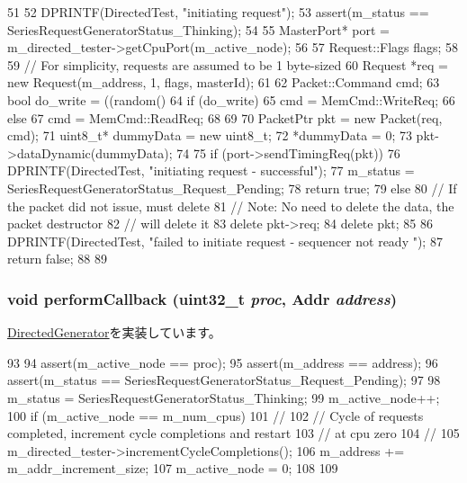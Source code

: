 \begin{DoxyCode}
51 {
52     DPRINTF(DirectedTest, "initiating request\n");
53     assert(m_status == SeriesRequestGeneratorStatus_Thinking);
54 
55     MasterPort* port = m_directed_tester->getCpuPort(m_active_node);
56 
57     Request::Flags flags;
58 
59     // For simplicity, requests are assumed to be 1 byte-sized
60     Request *req = new Request(m_address, 1, flags, masterId);
61 
62     Packet::Command cmd;
63     bool do_write = ((random() %
64     if (do_write) {
65         cmd = MemCmd::WriteReq;
66     } else {
67         cmd = MemCmd::ReadReq;
68     }
69 
70     PacketPtr pkt = new Packet(req, cmd);
71     uint8_t* dummyData = new uint8_t;
72     *dummyData = 0;
73     pkt->dataDynamic(dummyData);
74 
75     if (port->sendTimingReq(pkt)) {
76         DPRINTF(DirectedTest, "initiating request - successful\n");
77         m_status = SeriesRequestGeneratorStatus_Request_Pending;
78         return true;
79     } else {
80         // If the packet did not issue, must delete
81         // Note: No need to delete the data, the packet destructor
82         // will delete it
83         delete pkt->req;
84         delete pkt;
85 
86         DPRINTF(DirectedTest, "failed to initiate request - sequencer not ready\n
      ");
87         return false;
88     }
89 }
\end{DoxyCode}
\hypertarget{classSeriesRequestGenerator_a8c30329193052bf044bac8ee3e075475}{
\subsubsection[{performCallback}]{\setlength{\rightskip}{0pt plus 5cm}void performCallback ({\bf uint32\_\-t} {\em proc}, \/  {\bf Addr} {\em address})}}
\label{classSeriesRequestGenerator_a8c30329193052bf044bac8ee3e075475}


\hyperlink{classDirectedGenerator_a5aad2098d3cbda728f41beff10faea99}{DirectedGenerator}を実装しています。


\begin{DoxyCode}
93 {
94     assert(m_active_node == proc);
95     assert(m_address == address);  
96     assert(m_status == SeriesRequestGeneratorStatus_Request_Pending);
97 
98     m_status = SeriesRequestGeneratorStatus_Thinking;
99     m_active_node++;
100     if (m_active_node == m_num_cpus) {
101         //
102         // Cycle of requests completed, increment cycle completions and restart
103         // at cpu zero
104         //
105         m_directed_tester->incrementCycleCompletions();
106         m_address += m_addr_increment_size;
107         m_active_node = 0;
108     }
109 }
\end{DoxyCode}


